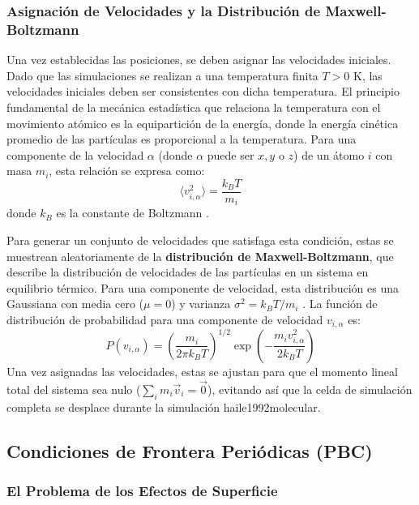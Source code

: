 \subsubsection{Asignación de Velocidades y la Distribución de Maxwell-Boltzmann}

Una vez establecidas las posiciones, se deben asignar las velocidades iniciales. Dado que las simulaciones se realizan a una temperatura finita $T > 0$ K, las velocidades iniciales deben ser consistentes con dicha temperatura. El principio fundamental de la mecánica estadística que relaciona la temperatura con el movimiento atómico es la equipartición de la energía, donde la energía cinética promedio de las partículas es proporcional a la temperatura. Para una componente de la velocidad $\alpha$ (donde $\alpha$ puede ser $x, y$ o $z$) de un átomo $i$ con masa $m_i$, esta relación se expresa como:
\begin{equation}
\langle v_{i,\alpha}^2 \rangle = \frac{k_B T}{m_i}
\end{equation}
donde $k_B$ es la constante de Boltzmann \cite[14]{zhou2022molecular}.

Para generar un conjunto de velocidades que satisfaga esta condición, estas se muestrean aleatoriamente de la \textbf{distribución de Maxwell-Boltzmann}, que describe la distribución de velocidades de las partículas en un sistema en equilibrio térmico. Para una componente de velocidad, esta distribución es una Gaussiana con media cero ($\mu=0$) y varianza $\sigma^2 = k_B T / m_i$ \cite[14]{zhou2022molecular}. La función de distribución de probabilidad para una componente de velocidad $v_{i,\alpha}$ es:
\begin{equation}
P(v_{i,\alpha}) = \left( \frac{m_i}{2\pi k_B T} \right)^{1/2} \exp\left( -\frac{m_i v_{i,\alpha}^2}{2 k_B T} \right)
\end{equation}
Una vez asignadas las velocidades, estas se ajustan para que el momento lineal total del sistema sea nulo ($\sum_i m_i \vec{v}_i = \vec{0}$), evitando así que la celda de simulación completa se desplace durante la simulación \cite[14, 130]{zhou2022molecular}{haile1992molecular}.

\subsection{Condiciones de Frontera Periódicas (PBC)}

\subsubsection{El Problema de los Efectos de Superficie}

